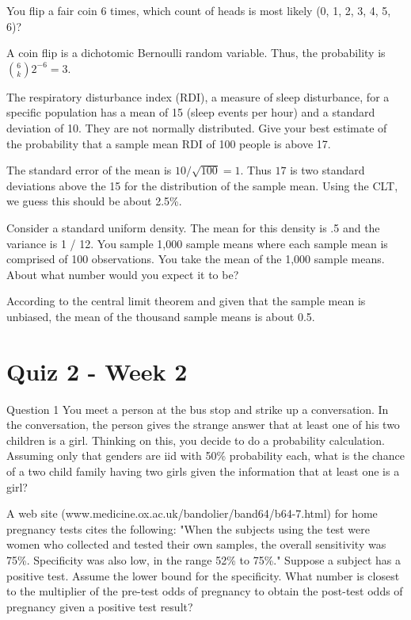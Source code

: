 \documentclass{homework}
\begin{document}
\begin{tcolorbox}[title=Question 11]
You flip a fair coin 6 times, which count of heads is most likely (0, 1, 2, 3, 4, 5, 6)?
\end{tcolorbox}

A coin flip is a dichotomic Bernoulli random variable. Thus, the probability is $\binom{6}{k} 2^{-6} = 3$.

\begin{tcolorbox}[title=Question 12]
The respiratory disturbance index (RDI), a measure of sleep disturbance, for a specific population has a mean of 15 (sleep events per hour) and a standard deviation of 10. They are not normally distributed. Give your best estimate of the probability that a sample mean RDI of 100 people is above 17.
\end{tcolorbox}

The standard error of the mean is $10 / \sqrt{100}
= 1$. Thus $17$ is two standard deviations above the 15 for the distribution of the sample mean. Using the CLT, we guess this should be about 2.5\%.

\begin{tcolorbox}[title=Question 13]
Consider a standard uniform density. The mean for this density is .5 and the variance is 1 / 12. You sample 1,000 sample means where each sample mean is comprised of 100 observations. You take the mean of the 1,000 sample means. About what number would you expect it to be?
\end{tcolorbox}

According to the central limit theorem and given that the sample mean is unbiased, the mean of the thousand sample means is about 0.5.

\section{Quiz 2 - Week 2}

\begin{tcolorbox}[title=Question 1]
Question 1
You meet a person at the bus stop and strike up a conversation. In the conversation, the person gives the strange answer that at least one of his two children is a girl. Thinking on this, you decide to do a probability calculation. Assuming only that genders are iid with 50\% probability each, what is the chance of a two child family having two girls given the information that at least one is a girl?
\end{tcolorbox}

\begin{tcolorbox}[title=Question 2]
A web site (www.medicine.ox.ac.uk/bandolier/band64/b64-7.html) for home pregnancy tests cites the following: "When the subjects using the test were women who collected and tested their own samples, the overall sensitivity was 75\%. Specificity was also low, in the range 52\% to 75\%." Suppose a subject has a positive test. Assume the lower bound for the specificity. What number is closest to the multiplier of the pre-test odds of pregnancy to obtain the post-test odds of pregnancy given a positive test result?
\end{tcolorbox}
\end{document}
